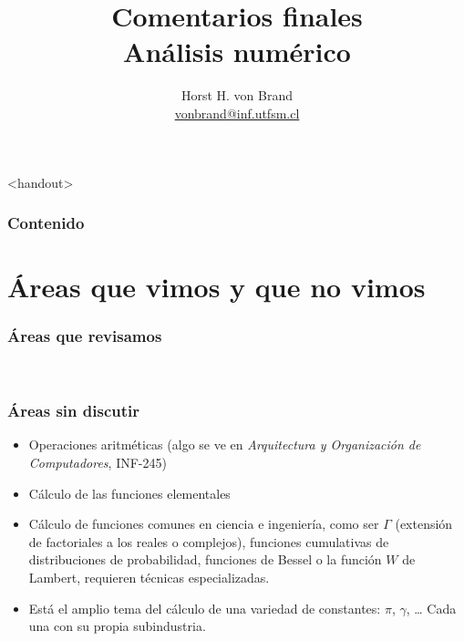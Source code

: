 \documentclass[english, spanish, fleqn,%
hyperref = {colorlinks, urlcolor = blue}%
]{beamer}
\title{Comentarios finales\\
         Análisis numérico}
\author[Horst H. von Brand]{Horst H. von Brand\\
  \href{mailto:vonbrand@inf.utfsm.cl}{vonbrand@inf.utfsm.cl}}
\institute[DI UTFSM]{Departamento de Informática\\
                     Universidad Técnica Federico Santa María}
\date{}
\begin{document}
\frame{\maketitle}

\begin{frame}<handout>
  \frametitle{Contenido}

  \tableofcontents
\end{frame}

\section{Áreas que vimos y que no vimos}

\begin{frame}
  \setcounter{beamerpauses}{2}
  \frametitle{Áreas que revisamos}

  \\ \medskip
\end{frame}

\begin{frame}
  \setcounter{beamerpauses}{2}
  \frametitle{Áreas sin discutir}

  \begin{itemize}
  \item
    Operaciones aritméticas
    (algo se ve en \emph{Arquitectura y Organización de Computadores}, INF-245)
  \item
    Cálculo de las funciones elementales%
  \item
    Cálculo de funciones comunes en ciencia e ingeniería,
    como ser \(\Gamma\)
    (extensión de factoriales a los reales o complejos),
    funciones cumulativas de distribuciones de probabilidad,
    funciones de Bessel o la función \(W\) de Lambert,
    requieren técnicas especializadas.
  \item
    Está el amplio tema del cálculo de una variedad de constantes:
    \(\pi\), \(\gamma\), \ldots{}
    Cada una con su propia subindustria.
  \end{itemize}
\end{frame}
\end{document}
